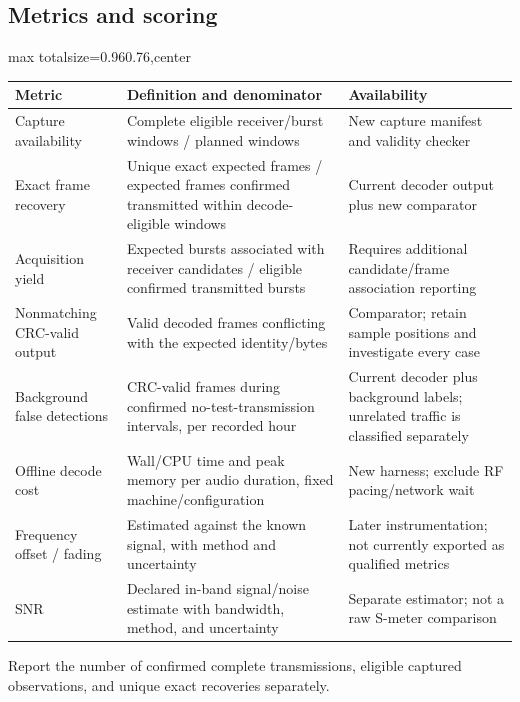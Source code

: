 \documentclass[11pt,a4paper]{article}
\newlength{\tableavail}
\renewcommand{\arraystretch}{1.13}
\begin{document}
\begin{landscape}\thispagestyle{plain}\centering
\subsection{Metrics and scoring}
\label{md:8}

\setlength{\tabcolsep}{5pt}\renewcommand{\arraystretch}{1.25}
\setlength{\tableavail}{\dimexpr\linewidth-4\tabcolsep\relax}
\begin{adjustbox}{max totalsize={0.96\linewidth}{0.76\textheight},center}
\begin{tabular}{@{}>{\raggedright\arraybackslash}p{0.23\tableavail}>{\raggedright\arraybackslash}p{0.54\tableavail}>{\raggedright\arraybackslash}p{0.23\tableavail}@{}}
\toprule
\textbf{Metric} & \textbf{Definition and denominator} & \textbf{Availability}\\
\midrule
Capture availability & Complete eligible receiver/burst windows / planned windows & New capture manifest and validity checker\\[5pt]
Exact frame recovery & Unique exact expected frames / expected frames confirmed transmitted within decode-eligible windows & Current decoder output plus new comparator\\[5pt]
Acquisition yield & Expected bursts associated with receiver candidates / eligible confirmed transmitted bursts & Requires additional candidate/frame association reporting\\[5pt]
Nonmatching CRC-valid output & Valid decoded frames conflicting with the expected identity/bytes & Comparator; retain sample positions and investigate every case\\[5pt]
Background false detections & CRC-valid frames during confirmed no-test-transmission intervals, per recorded hour & Current decoder plus background labels; unrelated traffic is classified separately\\[5pt]
Offline decode cost & Wall/CPU time and peak memory per audio duration, fixed machine/configuration & New harness; exclude RF pacing/network wait\\[5pt]
Frequency offset / fading & Estimated against the known signal, with method and uncertainty & Later instrumentation; not currently exported as qualified metrics\\[5pt]
SNR & Declared in-band signal/noise estimate with bandwidth, method, and uncertainty & Separate estimator; not a raw S-meter comparison\\[5pt]
\bottomrule
\end{tabular}
\end{adjustbox}
\end{landscape}
Report the number of confirmed complete transmissions, eligible captured observations, and unique exact recoveries separately.
\end{document}
